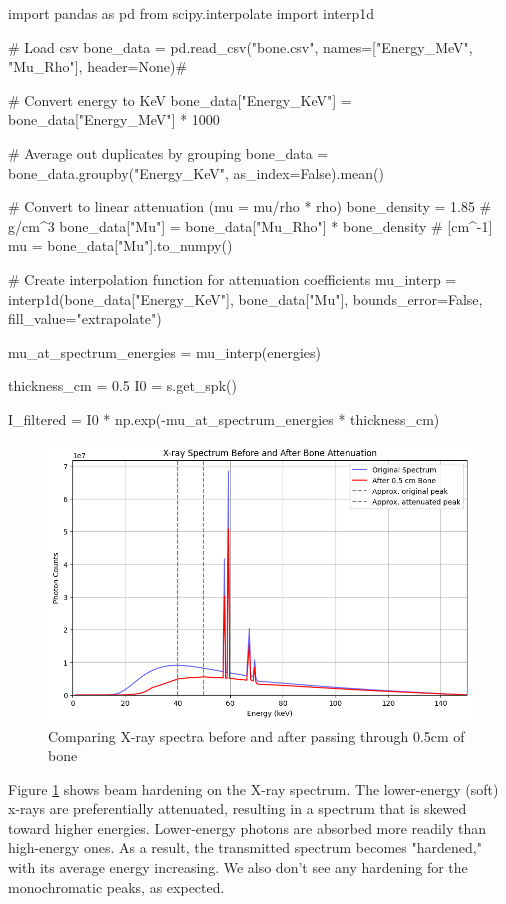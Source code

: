 \documentclass{article}
\begin{document}
\begin{python}
import pandas as pd
from scipy.interpolate import interp1d

# Load csv
bone_data = pd.read_csv("bone.csv", names=["Energy_MeV", "Mu_Rho"], header=None)#

# Convert energy to KeV
bone_data["Energy_KeV"] = bone_data["Energy_MeV"] * 1000

# Average out duplicates by grouping
bone_data = bone_data.groupby("Energy_KeV", as_index=False).mean()

# Convert to linear attenuation (mu = mu/rho * rho)
bone_density = 1.85  # g/cm^3
bone_data["Mu"] = bone_data["Mu_Rho"] * bone_density  # [cm^-1]
mu = bone_data["Mu"].to_numpy()

# Create interpolation function for attenuation coefficients
mu_interp = interp1d(bone_data["Energy_KeV"], bone_data["Mu"], bounds_error=False, fill_value="extrapolate")

mu_at_spectrum_energies = mu_interp(energies)

thickness_cm = 0.5
I0 = s.get_spk()

I_filtered = I0 * np.exp(-mu_at_spectrum_energies * thickness_cm)
\end{python}

\begin{figure}[H]
	\includegraphics[width=\linewidth]{beamhardening.png}
	\caption{Comparing X-ray spectra before and after passing through 0.5cm of bone}
  \label{fig:beamhardening}
\end{figure}

Figure \ref{fig:beamhardening} shows beam hardening on the X-ray spectrum. The lower-energy (soft) x-rays are preferentially attenuated, resulting in a spectrum that is skewed toward higher energies. Lower-energy photons are absorbed more readily than high-energy ones. As a result, the transmitted spectrum becomes "hardened," with its average energy increasing. We also don't see any hardening for the monochromatic peaks, as expected. 
\end{document}

